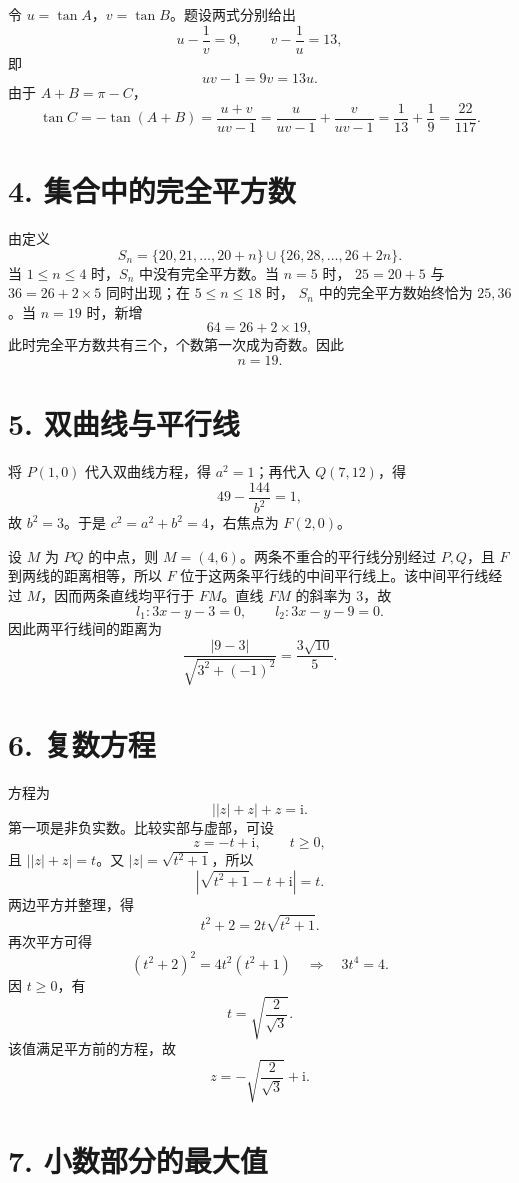 \documentclass[UTF8,11pt]{ctexart}
\newcommand{\ans}[1]{\boxed{#1}}
\begin{document}
令 $u=\tan A$，$v=\tan B$。题设两式分别给出
\[
  u-\frac1v=9,\qquad v-\frac1u=13,
\]
即
\[
  uv-1=9v=13u.
\]
由于 $A+B=\pi-C$，
\[
  \tan C=-\tan(A+B)=\frac{u+v}{uv-1}
  =\frac{u}{uv-1}+\frac{v}{uv-1}
  =\frac1{13}+\frac19
  =\ans{\frac{22}{117}}.
\]

\section*{4. 集合中的完全平方数}

由定义
\[
  S_n=\{20,21,\ldots,20+n\}
  \cup\{26,28,\ldots,26+2n\}.
\]
当 $1\leqslant n\leqslant4$ 时，$S_n$ 中没有完全平方数。当 $n=5$ 时，
$25=20+5$ 与 $36=26+2\times5$ 同时出现；在 $5\leqslant n\leqslant18$ 时，
$S_n$ 中的完全平方数始终恰为 $25,36$。当 $n=19$ 时，新增
\[
  64=26+2\times19,
\]
此时完全平方数共有三个，个数第一次成为奇数。因此
\[
  \ans{n=19}.
\]

\section*{5. 双曲线与平行线}

将 $P(1,0)$ 代入双曲线方程，得 $a^2=1$；再代入 $Q(7,12)$，得
\[
  49-\frac{144}{b^2}=1,
\]
故 $b^2=3$。于是 $c^2=a^2+b^2=4$，右焦点为 $F(2,0)$。

设 $M$ 为 $PQ$ 的中点，则 $M=(4,6)$。两条不重合的平行线分别经过 $P,Q$，且
$F$ 到两线的距离相等，所以 $F$ 位于这两条平行线的中间平行线上。该中间平行线经过
$M$，因而两条直线均平行于 $FM$。直线 $FM$ 的斜率为 $3$，故
\[
  l_1:3x-y-3=0,\qquad l_2:3x-y-9=0.
\]
因此两平行线间的距离为
\[
  \frac{|9-3|}{\sqrt{3^2+(-1)^2}}
  =\ans{\frac{3\sqrt{10}}5}.
\]

\section*{6. 复数方程}

方程为
\[
  \bigl||z|+z\bigr|+z=\mathrm i.
\]
第一项是非负实数。比较实部与虚部，可设
\[
  z=-t+\mathrm i,\qquad t\geqslant0,
\]
且 $\bigl||z|+z\bigr|=t$。又 $|z|=\sqrt{t^2+1}$，所以
\[
  \left|\sqrt{t^2+1}-t+\mathrm i\right|=t.
\]
两边平方并整理，得
\[
  t^2+2=2t\sqrt{t^2+1}.
\]
再次平方可得
\[
  (t^2+2)^2=4t^2(t^2+1)
  \quad\Longrightarrow\quad 3t^4=4.
\]
因 $t\geqslant0$，有
\[
  t=\sqrt{\frac2{\sqrt3}}.
\]
该值满足平方前的方程，故
\[
  \ans{z=-\sqrt{\frac2{\sqrt3}}+\mathrm i}.
\]

\section*{7. 小数部分的最大值}
\end{document}
